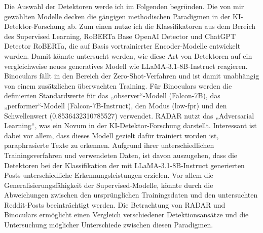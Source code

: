 Die Auswahl der Detektoren werde ich im Folgenden begründen. Die von mir gewählten Modelle decken die gängigen methodischen Paradigmen in der KI-Detektor-Forschung ab. Zum einen nutze ich die Klassifikatoren aus dem Bereich des Supervised Learning, RoBERTa Base OpenAI Detector und ChatGPT Detector RoBERTa, die auf Basis vortrainierter Encoder-Modelle entwickelt wurden. Damit könnte untersucht werden, wie diese Art von Detektoren auf ein vergleichweise neues generatives Modell wie LLaMA-3.1-8B-Instruct reagieren. Binoculars fällt in den Bereich der Zero-Shot-Verfahren und ist damit unabhängig von einem zusätzlichen überwachten Training. Für Binoculars werden die definierten Standardwerte für das „observer“-Modell (Falcon-7B), das „performer“-Modell (Falcon-7B-Instruct), den Modus (low-fpr) und den Schwellenwert (0.8536432310785527) verwendet.  RADAR nutzt das „Adversarial Learning“, was ein Novum in der KI-Detektor-Forschung darstellt. Interessant ist dabei vor allem, dass dieses Modell gezielt dafür trainiert worden ist, paraphrasierte Texte zu erkennen. Aufgrund ihrer unterschiedlichen Trainingsverfahren und verwendeten Daten, ist davon auszugehen, dass die Detektoren bei der Klassifikation der mit LLaMA-3.1-8B-Instruct generierten Posts unterschiedliche Erkennungsleistungen erzielen. Vor allem die Generalisierungsfähigkeit der Supervised-Modelle, könnte durch die Abweichungen zwischen den ursprünglichen Trainingsdaten und den untersuchten Reddit-Posts beeinträchtigt werden. Die Betrachtung von RADAR und Binoculars ermöglicht einen Vergleich verschiedener Detektionsansätze und die Untersuchung möglicher Unterschiede zwischen diesen Paradigmen.

